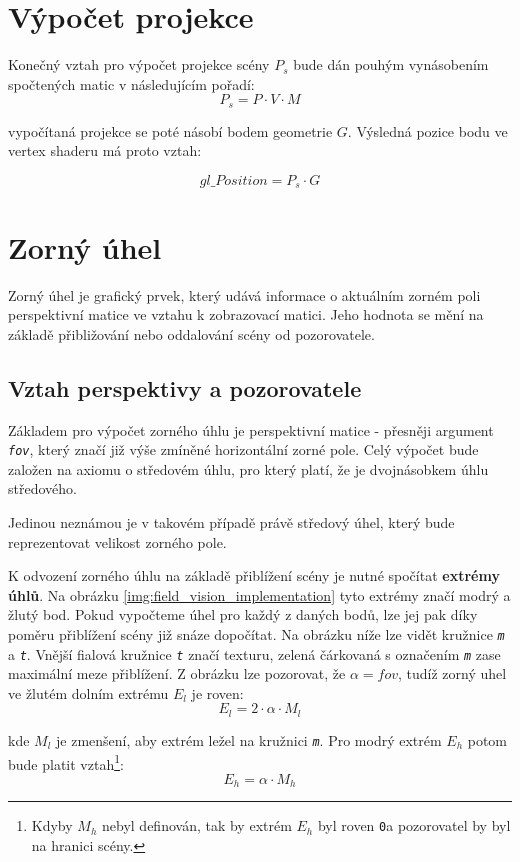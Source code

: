 \section{Výpočet projekce}
Konečný  vztah pro výpočet projekce scény $P_{s}$ bude dán pouhým vynásobením spočtených matic v následujícím pořadí:
$$ P_{s} = P \cdot V \cdot M  $$

 
vypočítaná projekce se poté násobí bodem geometrie $G$. Výsledná pozice bodu ve vertex shaderu má proto   vztah:

$$ gl\_Position  = P_{s} \cdot G$$

\newpage

\section{Zorný úhel}
Zorný úhel je grafický prvek, který udává informace o aktuálním zorném poli  perspektivní matice ve vztahu k zobrazovací matici. Jeho hodnota se mění na základě přibližování nebo oddalování scény od pozorovatele. 


\subsection{Vztah perspektivy a pozorovatele}
Základem pro výpočet zorného úhlu je perspektivní matice - přesněji argument \texttt{\textit{fov}}, který značí již výše zmíněné horizontální zorné pole. Celý výpočet bude  založen na axiomu o středovém úhlu, pro který platí, že je dvojnásobkem úhlu středového.\cite{planimetrie} 

Jedinou neznámou je v takovém případě právě středový úhel, který bude reprezentovat velikost zorného pole.

K odvození zorného úhlu na základě přiblížení scény je nutné spočítat \textbf{extrémy úhlů}. Na obrázku \ref{img:field_vision_implementation} tyto extrémy značí modrý a žlutý bod. Pokud vypočteme úhel pro každý z daných bodů, lze jej pak díky poměru přiblížení scény již snáze dopočítat. Na obrázku níže lze vidět kružnice \texttt{\textit{m}} a \texttt{\textit{t}}. Vnější fialová kružnice \texttt{\textit{t}} značí texturu, zelená čárkovaná  s označením \texttt{\textit{m}} zase maximální meze přiblížení. Z obrázku lze pozorovat, že $ \alpha = fov$, tudíž zorný uhel ve žlutém dolním extrému $E_{l}$ je roven: $$ E_{l} = 2 \cdot \alpha \cdot M_{l} $$

kde $M_{l}$ je zmenšení, aby extrém ležel na kružnici \texttt{\textit{m}}. Pro modrý extrém $E_{h}$ potom bude platit vztah\footnote{Kdyby $M_{h}$ nebyl definován, tak by extrém $E_{h}$ byl roven \texttt{0}\degree a pozorovatel by byl na hranici scény.}: $$ E_{h} = \alpha \cdot M_{h} $$


